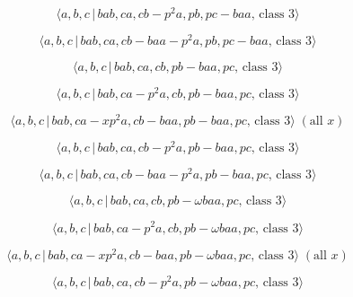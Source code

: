 \documentclass[10pt]{article}
\begin{document}
\begin{equation}
\langle a,b,c\,|\,bab,ca,cb-p^2a,pb,pc-baa,\,\text{class }3\rangle 
\tag{7.1034}
\end{equation}

\begin{equation}
\langle a,b,c\,|\,bab,ca,cb-baa-p^2a,pb,pc-baa,\,\text{class }3\rangle 
\tag{7.1035}
\end{equation}

\begin{equation}
\langle a,b,c\,|\,bab,ca,cb,pb-baa,pc,\,\text{class }3\rangle  \tag{7.1036}
\end{equation}

\begin{equation}
\langle a,b,c\,|\,bab,ca-p^2a,cb,pb-baa,pc,\,\text{class }3\rangle 
\tag{7.1037}
\end{equation}

\begin{equation}
\langle a,b,c\,|\,bab,ca-xp^2a,cb-baa,pb-baa,pc,\,\text{class }3\rangle \;(%
\text{all }x)  \tag{7.1038}
\end{equation}

\begin{equation}
\langle a,b,c\,|\,bab,ca,cb-p^2a,pb-baa,pc,\,\text{class }3\rangle 
\tag{7.1039}
\end{equation}

\begin{equation}
\langle a,b,c\,|\,bab,ca,cb-baa-p^2a,pb-baa,pc,\,\text{class }3\rangle 
\tag{7.1040}
\end{equation}

\begin{equation}
\langle a,b,c\,|\,bab,ca,cb,pb-\omega baa,pc,\,\text{class }3\rangle 
\tag{7.1041}
\end{equation}

\begin{equation}
\langle a,b,c\,|\,bab,ca-p^{2}a,cb,pb-\omega baa,pc,\,\text{class }3\rangle 
\tag{7.1042}
\end{equation}

\begin{equation}
\langle a,b,c\,|\,bab,ca-xp^{2}a,cb-baa,pb-\omega baa,pc,\,\text{class }%
3\rangle \;(\text{all }x)  \tag{7.1043}
\end{equation}

\begin{equation}
\langle a,b,c\,|\,bab,ca,cb-p^{2}a,pb-\omega baa,pc,\,\text{class }3\rangle 
\tag{7.1044}
\end{equation}
\end{document}
